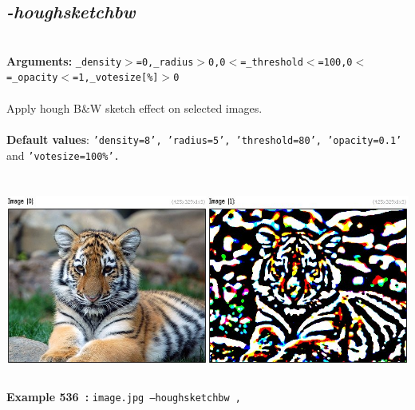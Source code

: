 \documentclass[a4paper,11pt,twoside]{book}
\begin{document}
\subsection{\emph{-houghsketchbw} }\vspace*{-0.5em}
~\\\textbf{Arguments: } 
{\small \texttt{\_density$>$=0,\_radius$>$0,0$<$=\_threshold$<$=100,0$<$=\_opacity$<$=1,\_votesize[\%]$>$0}}\\~\\
Apply hough B\&W sketch effect on selected images.
~\\~\\\textbf{Default values}: {\small \texttt{'density=8', 'radius=5', 'threshold=80', 'opacity=0.1'} and \texttt{'votesize=100\%'.}}
\begin{center}\includegraphics[keepaspectratio=true,height=7cm,width=\textwidth]{img/gmic_def536.jpg}\\
{\footnotesize \textbf{Example 536~:} \texttt{image.jpg --houghsketchbw ,}}
\end{center}
\end{document}
